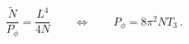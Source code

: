 \begin{equation}
\label{condi}
\frac{{\tilde N}}{P_\phi}=\frac{L^4}{4N} \qquad \Longleftrightarrow
\qquad P_\phi = 8 \pi^2 N T_3\, .
\end{equation}

